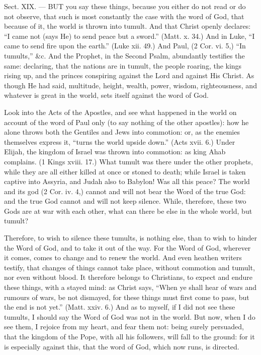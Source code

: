 
Sect. XIX. — BUT you say these things, because you either do not read or do not observe, that such is most constantly the case with the word of God, that because of it, the world is thrown into tumult. And that Christ openly declares: “I came not (says He) to send peace but a sword.” (Matt. x. 34.) And in Luke, “I came to send fire upon the earth.” (Luke xii. 49.) And Paul, (2 Cor. vi. 5,) “In tumults,” \&c. And the Prophet, in the Second Psalm, abundantly testifies the same: declaring, that the nations are in tumult, the people roaring, the kings rising up, and the princes conspiring against the Lord and against His Christ. As though He had said, multitude, height, wealth, power, wisdom, righteousness, and whatever is great in the world, sets itself against the word of God.

Look into the Acts of the Apostles, and see what happened in the world on account of the word of Paul only (to say nothing of the other apostles): how he alone throws both the Gentiles and Jews into commotion: or, as the enemies themselves express it, “turns the world upside down.” (Acts xvii. 6.) Under Elijah, the kingdom of Israel was thrown into commotion: as king Ahab complains. (1 Kings xviii. 17.) What tumult was there under the other prophets, while they are all either killed at once or stoned to death; while Israel is taken captive into Assyria, and Judah also to Babylon! Was all this peace? The world and its god (2 Cor. iv. 4,) cannot and will not bear the Word of the true God: and the true God cannot and will not keep silence. While, therefore, these two Gods are at war with each other, what can there be else in the whole world, but tumult?

Therefore, to wish to silence these tumults, is nothing else, than to wish to hinder the Word of God, and to take it out of the way. For the Word of God, wherever it comes, comes to change and to renew the world. And even heathen writers testify, that changes of things cannot take place, without commotion and tumult, nor even without blood. It therefore belongs to Christians, to expect and endure these things, with a stayed mind: as Christ says, “When ye shall hear of wars and rumours of wars, be not dismayed, for these things must first come to pass, but the end is not yet.” (Matt. xxiv. 6.) And as to myself, if I did not see these tumults, I should say the Word of God was not in the world. But now, when I do see them, I rejoice from my heart, and fear them not: being surely persuaded, that the kingdom of the Pope, with all his followers, will fall to the ground: for it is especially against this, that the word of God, which now runs, is directed.

